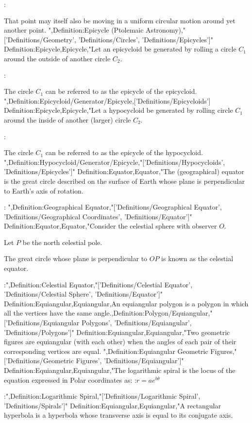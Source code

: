 :

That point may itself also be moving in a uniform circular motion around yet another point.
",Definition:Epicycle (Ptolemaic Astronomy),"['Definitions/Geometry', 'Definitions/Circles', 'Definitions/Epicycles']"
Definition:Epicycle,Epicycle,"Let an epicycloid be generated by rolling a circle $C_1$ around the outside of another circle $C_2$.


:


The circle $C_1$ can be referred to as the epicycle of the epicycloid.
",Definition:Epicycloid/Generator/Epicycle,['Definitions/Epicycloids']
Definition:Epicycle,Epicycle,"Let a hypocycloid be generated by rolling circle $C_1$ around the inside of another (larger) circle $C_2$.


:


The circle $C_1$ can be referred to as the epicycle of the hypocycloid.
",Definition:Hypocycloid/Generator/Epicycle,"['Definitions/Hypocycloids', 'Definitions/Epicycles']"
Definition:Equator,Equator,"The (geographical) equator is the great circle described on the surface of Earth whose plane is perpendicular to Earth's axis of rotation.


:
",Definition:Geographical Equator,"['Definitions/Geographical Equator', 'Definitions/Geographical Coordinates', 'Definitions/Equator']"
Definition:Equator,Equator,"Consider the celestial sphere with observer $O$.

Let $P$ be the north celestial pole.


The great circle whose plane is perpendicular to $OP$ is known as the celestial equator.


:",Definition:Celestial Equator,"['Definitions/Celestial Equator', 'Definitions/Celestial Sphere', 'Definitions/Equator']"
Definition:Equiangular,Equiangular,An equiangular polygon is a polygon in which all the vertices have the same angle.,Definition:Polygon/Equiangular,"['Definitions/Equiangular Polygons', 'Definitions/Equiangular', 'Definitions/Polygons']"
Definition:Equiangular,Equiangular,"Two geometric figures are equiangular (with each other) when the angles of each pair of their corresponding vertices are equal.
",Definition:Equiangular Geometric Figures,"['Definitions/Geometric Figures', 'Definitions/Equiangular']"
Definition:Equiangular,Equiangular,"The logarithmic spiral is the locus of the equation expressed in Polar coordinates as:
:$r = a e^{b \theta}$


:",Definition:Logarithmic Spiral,"['Definitions/Logarithmic Spiral', 'Definitions/Spirals']"
Definition:Equiangular,Equiangular,"A rectangular hyperbola is a hyperbola whose transverse axis is equal to its conjugate axis.


